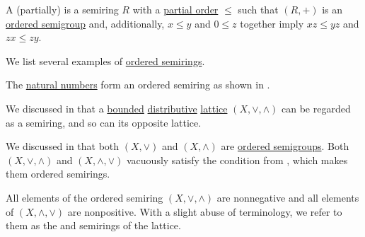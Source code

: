 \begin{definition}\label{def:ordered_semiring}
  A (partially)  is a semiring \( R \) with a \hyperref[def:partially_ordered_set]{partial order} \( \leq \) such that \( (R, +) \) is an \hyperref[def:ordered_semigroup]{ordered semigroup} and, additionally, \( x \leq y \) and \( 0 \leq z \) together imply \( xz \leq yz \) and \( zx \leq zy \).
\end{definition}

\begin{example}\label{ex:def:ordered_semiring}
  We list several examples of \hyperref[def:ordered_semiring]{ordered semirings}.

  \begin{thmenum}
     The \hyperref[def:natural_numbers]{natural numbers} form an ordered semiring as shown in .

     We discussed in  that a \hyperref[def:extremal_points/bounds]{bounded} \hyperref[def:distributive_lattice]{distributive} \hyperref[def:lattice]{lattice} \( (X, \vee, \wedge) \) can be regarded as a semiring, and so can its opposite lattice.

    We discussed in  that both \( (X, \vee) \) and \( (X, \wedge) \) are \hyperref[def:ordered_semigroup]{ordered semigroups}. Both \( (X, \vee, \wedge) \) and \( (X, \wedge, \vee) \) vacuously satisfy the condition from , which makes them ordered semirings.

    All elements of the ordered semiring \( (X, \vee, \wedge) \) are nonnegative and all elements of \( (X, \wedge, \vee) \) are nonpositive. With a slight abuse of terminology, we refer to them as the  and  semirings of the lattice.
  \end{thmenum}
\end{example}

